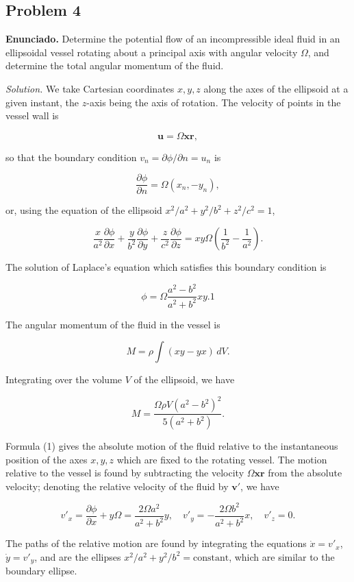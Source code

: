 \documentclass{article}
\begin{document}
\subsection*{Problem 4}

\textbf{Enunciado.} Determine the potential flow of an incompressible ideal fluid in an ellipsoidal vessel rotating about a principal axis with angular velocity $\Omega$, and determine the total angular momentum of the fluid.

\textit{Solution.} We take Cartesian coordinates $x, y, z$ along the axes of the ellipsoid at a given instant, the $z$-axis being the axis of rotation. The velocity of points in the vessel wall is

$$
\mathbf{u} = \Omega \mathbf{x} \mathbf{r},
$$

so that the boundary condition $v_n = \partial \phi/\partial n = u_n$ is

$$
\frac{\partial \phi}{\partial n} = \Omega (x_n, -y_n),
$$

or, using the equation of the ellipsoid $x^2/a^2 + y^2/b^2 + z^2/c^2 = 1$,

$$
\frac{x}{a^2} \frac{\partial \phi}{\partial x} + \frac{y}{b^2} \frac{\partial \phi}{\partial y} + \frac{z}{c^2} \frac{\partial \phi}{\partial z} = xy \Omega \left( \frac{1}{b^2} - \frac{1}{a^2} \right).
$$

The solution of Laplace's equation which satisfies this boundary condition is

$$
\phi = \Omega \frac{a^2 - b^2}{a^2 + b^2} xy. {1}
$$

The angular momentum of the fluid in the vessel is

$$
M = \rho \int (xy - yx) \, dV.
$$

Integrating over the volume $V$ of the ellipsoid, we have

$$
M = \frac{\Omega \rho V (a^2 - b^2)^2}{5(a^2 + b^2)}.
$$

Formula (1) gives the absolute motion of the fluid relative to the instantaneous position of the axes $x, y, z$ which are fixed to the rotating vessel. The motion relative to the vessel is found by subtracting the velocity $\Omega \mathbf{x} \mathbf{r}$ from the absolute velocity; denoting the relative velocity of the fluid by $\mathbf{v}'$, we have

$$
v'_x = \frac{\partial \phi}{\partial x} + y \Omega = \frac{2 \Omega a^2}{a^2 + b^2} y, \quad v'_y = -\frac{2 \Omega b^2}{a^2 + b^2} x, \quad v'_z = 0.
$$

The paths of the relative motion are found by integrating the equations $\dot{x} = v'_x$, $\dot{y} = v'_y$, and are the ellipses $x^2/a^2 + y^2/b^2 = \text{constant}$, which are similar to the boundary ellipse.
\end{document}
